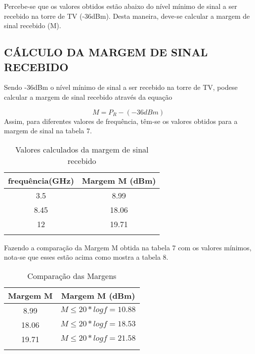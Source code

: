 \documentclass[a4paper,12pt]{article}
\begin{document}
Percebe-se que os valores obtidos estão abaixo do nível mínimo de sinal a ser
recebido na torre de TV (-36dBm). Desta maneira, deve-se calcular a margem de
sinal recebido (M).

\subsection{CÁLCULO DA MARGEM DE SINAL RECEBIDO}

Sendo -36dBm o nível mínimo de sinal a ser recebido na torre de TV, podese
calcular a margem de sinal recebido através da equação

\begin{equation}
 M = P_R -(-36dBm)
\end{equation}
  Assim, para diferentes valores de frequência, têm-se os valores obtidos para a
margem de sinal na tabela 7.

\begin{table}[!h]
  \begin{center}
    \caption{Valores calculados da margem de sinal recebido} 
    \begin{tabular}{p{3in} p{3in}}\hline \hline
      \multicolumn{1}{c}{frequência(GHz)} & \multicolumn{1}{c}{Margem M (dBm)}\\ \hline
      \multicolumn{1}{c}{3.5} & \multicolumn{1}{c}{8.99} \\ 
      \multicolumn{1}{c}{8.45} & \multicolumn{1}{c}{18.06} \\ 
      \multicolumn{1}{c}{12} & \multicolumn{1}{c}{19.71}\\ \hline
      &
    \end{tabular}
  \end{center}
\end{table}

Fazendo a comparação da Margem M obtida na tabela 7 com os valores mínimos,
nota-se que esses estão acima como mostra a tabela 8.

\begin{table}[!h]
  \begin{center}
    \caption{Comparação das Margens} 
    \begin{tabular}{p{3in} p{3in}}\hline \hline
      \multicolumn{1}{c}{Margem M} & \multicolumn{1}{c}{Margem M (dBm)}\\ \hline
      \multicolumn{1}{c}{8.99} & \multicolumn{1}{c}{$M \leq 20*log f = 10.88$} \\ 
      \multicolumn{1}{c}{18.06} & \multicolumn{1}{c}{$M \leq 20*log f = 18.53$} \\ 
      \multicolumn{1}{c}{19.71} & \multicolumn{1}{c}{$M \leq 20*log f = 21.58$}\\ \hline
      &
    \end{tabular}
  \end{center}
\end{table}
\end{document}
